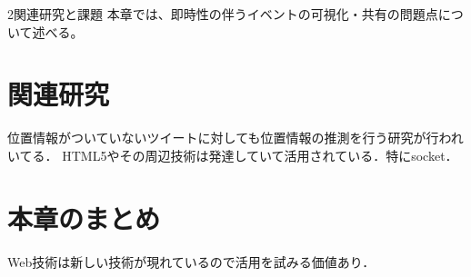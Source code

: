 \chapterhead
{2}{関連研究と課題}
{本章では、即時性の伴うイベントの可視化・共有の問題点について述べる。}

\section{関連研究}
位置情報がついていないツイートに対しても位置情報の推測を行う研究が行われいてる．\cite{inproceedings4}
HTML5やその周辺技術は発達していて活用されている\cite{inproceedings1}．特にsocket\cite{inproceedings3}．

\newpage

\section{本章のまとめ}
Web技術は新しい技術が現れているので活用を試みる価値あり．
